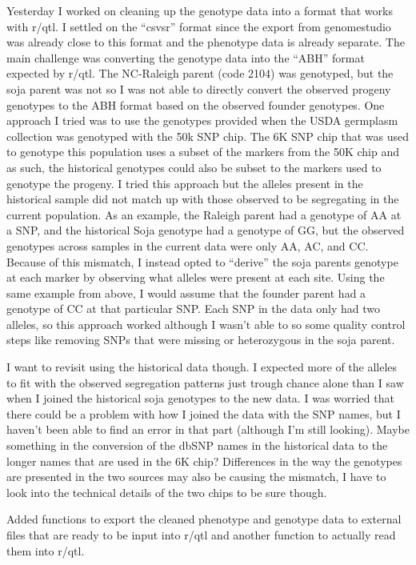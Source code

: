 \documentclass[
]{article}
\begin{document}
Yesterday I worked on cleaning up the genotype data into a format that
works with r/qtl. I settled on the ``csvsr'' format since the export
from genomestudio was already close to this format and the phenotype
data is already separate. The main challenge was converting the genotype
data into the ``ABH'' format expected by r/qtl. The NC-Raleigh parent
(code 2104) was genotyped, but the soja parent was not so I was not able
to directly convert the observed progeny genotypes to the ABH format
based on the observed founder genotypes. One approach I tried was to use
the genotypes provided when the USDA germplasm collection was genotyped
with the 50k SNP chip. The 6K SNP chip that was used to genotype this
population uses a subset of the markers from the 50K chip and as such,
the historical genotypes could also be subset to the markers used to
genotype the progeny. I tried this approach but the alleles present in
the historical sample did not match up with those observed to be
segregating in the current population. As an example, the Raleigh parent
had a genotype of AA at a SNP, and the historical Soja genotype had a
genotype of GG, but the observed genotypes across samples in the current
data were only AA, AC, and CC. Because of this mismatch, I instead opted
to ``derive'' the soja parents genotype at each marker by observing what
alleles were present at each site. Using the same example from above, I
would assume that the founder parent had a genotype of CC at that
particular SNP. Each SNP in the data only had two alleles, so this
approach worked although I wasn't able to so some quality control steps
like removing SNPs that were missing or heterozygous in the soja parent.

I want to revisit using the historical data though. I expected more of
the alleles to fit with the observed segregation patterns just trough
chance alone than I saw when I joined the historical soja genotypes to
the new data. I was worried that there could be a problem with how I
joined the data with the SNP names, but I haven't been able to find an
error in that part (although I'm still looking). Maybe something in the
conversion of the dbSNP names in the historical data to the longer names
that are used in the 6K chip? Differences in the way the genotypes are
presented in the two sources may also be causing the mismatch, I have to
look into the technical details of the two chips to be sure though.

Added functions to export the cleaned phenotype and genotype data to
external files that are ready to be input into r/qtl and another
function to actually read them into r/qtl.
\end{document}
